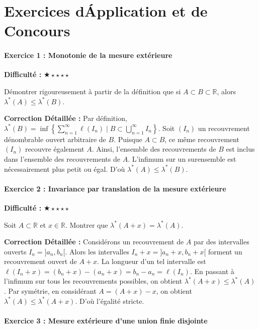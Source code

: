 \documentclass[11pt,a4paper]{article}
\begin{document}
\newpage
\part{Exercices d\'Application et de Concours}
\subsection*{Exercice 1 : Monotonie de la mesure extérieure}

\textbf{Difficulté :} $\bigstar\star\star\star\star$

Démontrer rigoureusement à partir de la définition que si $A \subset B \subset \mathbb{R}$, alors $\lambda^*(A) \le \lambda^*(B)$.

\textbf{Correction Détaillée :}
Par définition, $\lambda^*(B) = \inf \left\lbrace \sum_{n=1}^\infty \ell(I_n) \mid B \subset \bigcup_{n=1}^\infty I_n \right\rbrace$.
Soit $(I_n)$ un recouvrement dénombrable ouvert arbitraire de $B$. Puisque $A \subset B$, ce même recouvrement $(I_n)$ recouvre également $A$. Ainsi, l'ensemble des recouvrements de $B$ est inclus dans l'ensemble des recouvrements de $A$. L'infimum sur un surensemble est nécessairement plus petit ou égal. D'où $\lambda^*(A) \le \lambda^*(B)$.

\newpage
\subsection*{Exercice 2 : Invariance par translation de la mesure extérieure}

\textbf{Difficulté :} $\bigstar\star\star\star\star$

Soit $A \subset \mathbb{R}$ et $x \in \mathbb{R}$. Montrer que $\lambda^*(A + x) = \lambda^*(A)$.

\textbf{Correction Détaillée :}
Considérons un recouvrement de $A$ par des intervalles ouverts $I_n = ]a_n, b_n[$. Alors les intervalles $I_n + x = ]a_n + x, b_n + x[$ forment un recouvrement ouvert de $A + x$.
La longueur d'un tel intervalle est $\ell(I_n + x) = (b_n + x) - (a_n + x) = b_n - a_n = \ell(I_n)$.
En passant à l'infimum sur tous les recouvrements possibles, on obtient $\lambda^*(A + x) \le \lambda^*(A)$.
Par symétrie, en considérant $A = (A + x) - x$, on obtient $\lambda^*(A) \le \lambda^*(A + x)$. D'où l'égalité stricte.

\newpage
\subsection*{Exercice 3 : Mesure extérieure d'une union finie disjointe}
\end{document}
